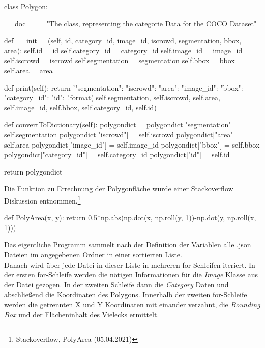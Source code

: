 \documentclass[a4paper,12pt,ngerman]{article}
\begin{document}
\begin{python}
class Polygon:
    
    __doc__ = "The class, representing the categorie Data for the COCO Dataset"

    def __init__(self, id, category_id, image_id, iscrowd, segmentation, bbox, area):
        self.id = id
        self.category_id = category_id
        self.image_id = image_id
        self.iscrowd = iscrowd
        self.segmentation = segmentation
        self.bbox = bbox
        self.area = area

    def print(self):
        return '"segmentation": {}\n"iscrowd": {}\n"area": {}\n"image_id": {}\n"bbox": {}\n"category_id": {}\n"id": {}\n'.format(
            self.segmentation,
            self.iscrowd,
            self.area,
            self.image_id,
            self.bbox,
            self.category_id,
            self.id)

    def convertToDictionary(self):
        polygondict = {}
        polygondict["segmentation"] = self.segmentation
        polygondict["iscrowd"] = self.iscrowd
        polygondict["area"] = self.area
        polygondict["image_id"] = self.image_id
        polygondict["bbox"] = self.bbox
        polygondict["category_id"] = self.category_id
        polygondict["id"] = self.id

        return polygondict
\end{python}

Die Funktion zu Errechnung der Polygonfläche wurde einer Stackoverflow Diskussion entnommen.\footnote{Stackoverflow, PolyArea (05.04.2021)} \\

\begin{python}
def PolyArea(x, y):
    return 0.5*np.abs(np.dot(x, np.roll(y, 1))-np.dot(y, np.roll(x, 1)))
\end{python}

Das eigentliche Programm sammelt nach der Definition der Variablen alle .json Dateien im angegebenen Ordner in einer sortierten Liste. \\
Danach wird über jede Datei in dieser Liste in mehreren for-Schleifen iteriert. In der ersten for-Schleife werden die nötigen Informationen für die \textit{Image} Klasse aus der Datei gezogen. In der zweiten Schleife dann die \textit{Category} Daten und abschließend die Koordinaten des Polygons. Innerhalb der zweiten for-Schleife werden die getrennten X und Y Koordinaten mit einander verzahnt, die \textit{Bounding Box} und der Flächeninhalt des Vielecks ermittelt.
\end{document}
